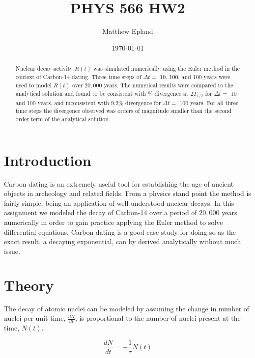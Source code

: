 \documentclass[notitlepage,aps,prd,nofootinbib]{revtex4-1}
\begin{document}
\title{PHYS 566 HW2}
\author{Matthew Epland}

\date{\today}

\begin{abstract}
Nuclear decay activity $R\left(t\right)$ was simulated numerically using the Euler method in the context of Carbon-14 dating. Three time steps of $\Delta t =$ 10, 100, and 100 years were used to model $R\left(t\right)$ over $20,000$ years. The numerical results were compared to the analytical solution and found to be consistent with \% divergence at $2T_{1/2}$ for $\Delta t =$ 10 and 100 years, and inconsistent with 9.2\% divergence for $\Delta t =$ 100 years. For all three time steps the divergence observed was orders of magnitude smaller than the second order term of the analytical solution.
\end{abstract}\maketitle


\section{Introduction}
\label{sec:intro}
Carbon dating is an extremely useful tool for establishing the age of ancient objects in archeology and related fields. From a physics stand point the method is fairly simple, being an application of well understood nuclear decays. In this assignment we modeled the decay of Carbon-14 over a period of $20,000$ years numerically in order to gain practice applying the Euler method to solve differential equations. Carbon dating is a good case study for doing so as the exact result, a decaying exponential, can by derived analytically without much issue.

\section{Theory}
\label{sec:theory}

The decay of atomic nuclei can be modeled by assuming the change in number of nuclei per unit time, $\frac{d N}{d t}$, is proportional to the number of nuclei present at the time, $N\left(t\right)$.

\begin{equation} \label{eq:deq}
\frac{d N}{d t} = -\frac{1}{\tau} N\left(t\right)
\end{equation}
\end{document}
